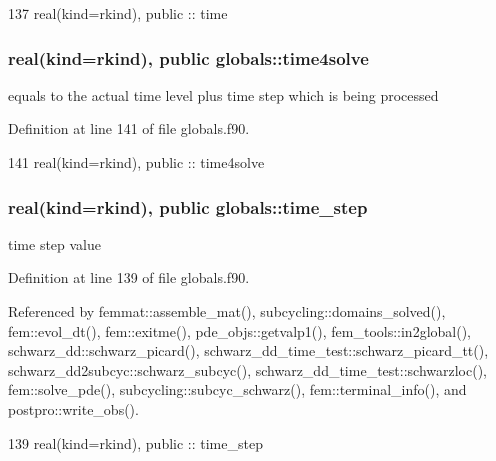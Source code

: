 \begin{DoxyCode}
137   \textcolor{keywordtype}{real(kind=rkind)}, \textcolor{keywordtype}{public} :: time
\end{DoxyCode}
\subsubsection[{time4solve}]{\setlength{\rightskip}{0pt plus 5cm}real(kind=rkind), public globals\+::time4solve}\label{namespaceglobals_acae54674e5a9f90e2fb2ab0ae022e49b}


equals to the actual time level plus time step which is being processed 



Definition at line 141 of file globals.\+f90.


\begin{DoxyCode}
141   \textcolor{keywordtype}{real(kind=rkind)}, \textcolor{keywordtype}{public} :: time4solve
\end{DoxyCode}
\subsubsection[{time\+\_\+step}]{\setlength{\rightskip}{0pt plus 5cm}real(kind=rkind), public globals\+::time\+\_\+step}\label{namespaceglobals_a415e4646993ceb3c3fa844b1a0868992}


time step value 



Definition at line 139 of file globals.\+f90.



Referenced by femmat\+::assemble\+\_\+mat(), subcycling\+::domains\+\_\+solved(), fem\+::evol\+\_\+dt(), fem\+::exitme(), pde\+\_\+objs\+::getvalp1(), fem\+\_\+tools\+::in2global(), schwarz\+\_\+dd\+::schwarz\+\_\+picard(), schwarz\+\_\+dd\+\_\+time\+\_\+test\+::schwarz\+\_\+picard\+\_\+tt(), schwarz\+\_\+dd2subcyc\+::schwarz\+\_\+subcyc(), schwarz\+\_\+dd\+\_\+time\+\_\+test\+::schwarzloc(), fem\+::solve\+\_\+pde(), subcycling\+::subcyc\+\_\+schwarz(), fem\+::terminal\+\_\+info(), and postpro\+::write\+\_\+obs().


\begin{DoxyCode}
139   \textcolor{keywordtype}{real(kind=rkind)}, \textcolor{keywordtype}{public} :: time_step
\end{DoxyCode}

